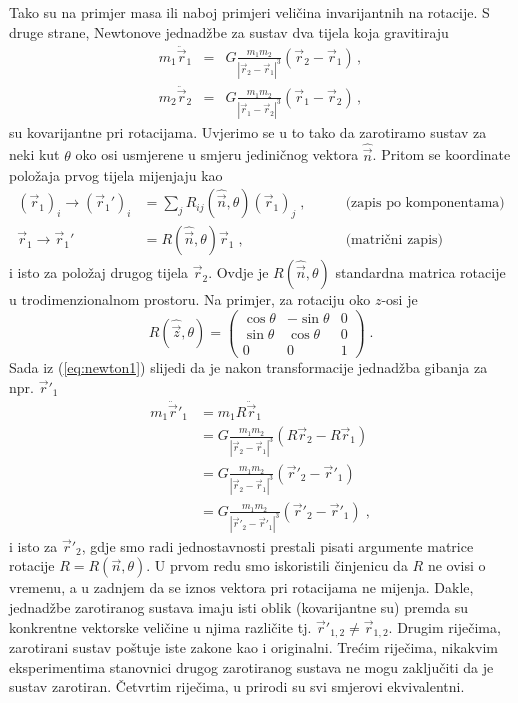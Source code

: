 Tako su na primjer masa ili naboj primjeri veličina invarijantnih na rotacije.
S druge strane, Newtonove jednadžbe za sustav dva tijela koja gravitiraju
\begin{eqnarray}
 m_1 \ddot{\vec{r}}_1 & = & G \frac{m_1 m_2}{|\vec{r}_2 - \vec{r}_1|^3}
    (\vec{r}_2 - \vec{r}_1) \label{eq:newton1} \,, \\
 m_2 \ddot{\vec{r}}_2 & = & G \frac{m_1 m_2}{|\vec{r}_1 - \vec{r}_2|^3}
    (\vec{r}_1 - \vec{r}_2) \,,
\end{eqnarray}
su kovarijantne pri rotacijama. Uvjerimo se u to tako da zarotiramo
sustav za neki kut $\theta$ oko osi usmjerene u smjeru jediničnog vektora $\hat{\vec{n}}$.
Pritom se koordinate položaja prvog tijela mijenjaju kao
\begin{align*}
(\vec{r}_{1})_i \to (\vec{r}_{1}')_i &= \sum_j R_{ij}(\hat{\vec{n}},\theta) 
   (\vec{r}_{1})_j \;, \qquad& \text{(zapis po komponentama)}\\
\vec{r}_{1}\to \vec{r}_{1}' &= R(\hat{\vec{n}},\theta) 
   \vec{r}_{1}\;, \qquad& \text{(matrični zapis)}
\end{align*}
i isto za položaj drugog tijela $\vec{r}_2$.
Ovdje je $R(\hat{\vec{n}},\theta)$ standardna matrica rotacije u trodimenzionalnom
prostoru. Na primjer, za rotaciju oko $z$-osi je
\begin{equation}
R(\hat{\vec{z}},\theta) = \begin{pmatrix}
\cos\theta &  -\sin\theta &  0 \\
\sin\theta &  \cos\theta &  0 \\
    0  &       0     &  1 
\end{pmatrix} \;.
\label{eq:matrot}
\end{equation}
Sada iz (\ref{eq:newton1}) slijedi da je nakon transformacije
jednadžba gibanja za npr. $\vec{r}'_1$ 
\begin{equation}
\begin{split}
m_1 \ddot{\vec{r}}'_1 &= m_1 R \ddot{\vec{r}}_1 \\
   &= G \frac{m_1 m_2}{|\vec{r}_2 - \vec{r}_1|^3}
    (R\vec{r}_2 - R\vec{r}_1) \\
   &= G \frac{m_1 m_2}{|\vec{r}_2 - \vec{r}_1|^3}
    (\vec{r}'_2 - \vec{r}'_1) \\
   &= G \frac{m_1 m_2}{|\vec{r}'_2 - \vec{r}'_1|^3}
    (\vec{r}'_2 - \vec{r}'_1) \;,
\end{split}
\label{eq:kovarijantniNewton}
\end{equation}
i isto za $\vec{r}'_2$, gdje smo radi jednostavnosti prestali
pisati argumente matrice rotacije $R = R(\vec{n},\theta)$.
U prvom redu smo iskoristili činjenicu da $R$ ne ovisi o vremenu,
a u zadnjem da se iznos vektora pri rotacijama ne mijenja.
Dakle, jednadžbe zarotiranog sustava imaju isti oblik
(kovarijantne su) premda su konkrentne vektorske veličine
u njima različite tj. $\vec{r}'_{1,2} \neq \vec{r}_{1,2}$.
Drugim riječima, zarotirani sustav poštuje iste zakone kao
i originalni. Trećim riječima, nikakvim eksperimentima stanovnici
drugog zarotiranog sustava ne mogu zaključiti da je sustav zarotiran.
Četvrtim riječima, u prirodi su svi smjerovi ekvivalentni.

